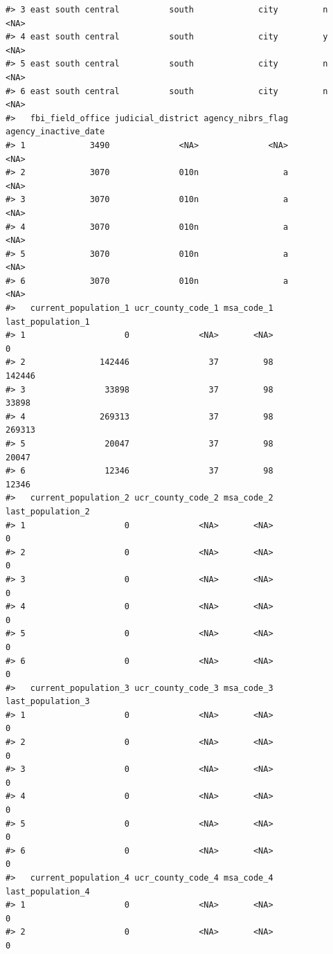 \documentclass[
]{krantz}
\begin{document}
\begin{verbatim}
#> 3 east south central          south             city         n           <NA>
#> 4 east south central          south             city         y           <NA>
#> 5 east south central          south             city         n           <NA>
#> 6 east south central          south             city         n           <NA>
#>   fbi_field_office judicial_district agency_nibrs_flag agency_inactive_date
#> 1             3490              <NA>              <NA>                 <NA>
#> 2             3070              010n                 a                 <NA>
#> 3             3070              010n                 a                 <NA>
#> 4             3070              010n                 a                 <NA>
#> 5             3070              010n                 a                 <NA>
#> 6             3070              010n                 a                 <NA>
#>   current_population_1 ucr_county_code_1 msa_code_1 last_population_1
#> 1                    0              <NA>       <NA>                 0
#> 2               142446                37         98            142446
#> 3                33898                37         98             33898
#> 4               269313                37         98            269313
#> 5                20047                37         98             20047
#> 6                12346                37         98             12346
#>   current_population_2 ucr_county_code_2 msa_code_2 last_population_2
#> 1                    0              <NA>       <NA>                 0
#> 2                    0              <NA>       <NA>                 0
#> 3                    0              <NA>       <NA>                 0
#> 4                    0              <NA>       <NA>                 0
#> 5                    0              <NA>       <NA>                 0
#> 6                    0              <NA>       <NA>                 0
#>   current_population_3 ucr_county_code_3 msa_code_3 last_population_3
#> 1                    0              <NA>       <NA>                 0
#> 2                    0              <NA>       <NA>                 0
#> 3                    0              <NA>       <NA>                 0
#> 4                    0              <NA>       <NA>                 0
#> 5                    0              <NA>       <NA>                 0
#> 6                    0              <NA>       <NA>                 0
#>   current_population_4 ucr_county_code_4 msa_code_4 last_population_4
#> 1                    0              <NA>       <NA>                 0
#> 2                    0              <NA>       <NA>                 0

\end{verbatim}
\end{document}
